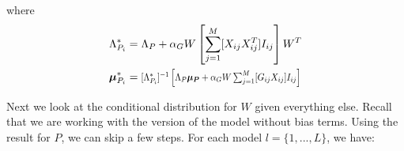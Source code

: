 \documentclass[10pt]{proc}
\begin{document}
%
where
%
\begin{align}
    \Lambda_{P_i}^* &= \begin{aligned}[t]
        \Lambda_P + \alpha_G W \left[\sum_{j=1}^M
            [X_{ij} X_{ij}^T] I_{ij}
        \right] W^T
    \end{aligned}\\
%
    \bm{\mu}_{P_i}^* &= \begin{aligned}[t]
        \vstretch{0.9}{\hstretch{0.8}{
            [\Lambda_{P_i}^*]^{-1} \left[
                \Lambda_P\bm{\mu_P} +
                \alpha_G W \sum_{j=1}^M [G_{ij} X_{ij}] I_{ij}
            \right]}}
    \end{aligned}
\end{align}

Next we look at the conditional distribution for $W$ given everything else.
Recall that we are working with the version of the model without bias terms.
Using the result for $P$, we can skip a few steps. For each model $l = \{1, ...,
L\}$, we have:
%
\end{document}
